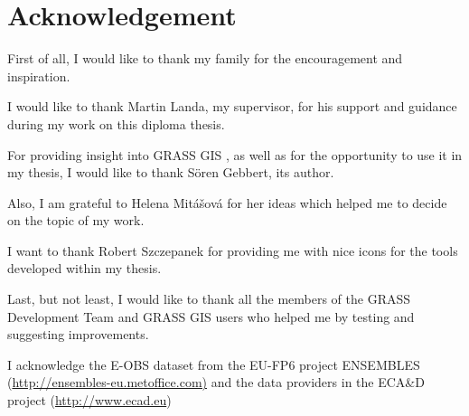 \chapter*{Acknowledgement}
\thispagestyle{empty}

First of all, I would like to thank my family for the encouragement and inspiration.

I would like to thank Martin Landa, my supervisor, for his support
and guidance during my work on this diploma thesis.

For providing insight into GRASS GIS \tf, as well as
for the opportunity to use it in my thesis, I would like to thank S\"{o}ren Gebbert, its author.

Also, I am grateful to Helena Mitášová for her ideas
which helped me to decide on the topic of my work.

I want to thank Robert Szczepanek for providing me with nice icons for the tools developed within my thesis.

Last, but not least, I would like to thank all the members of the GRASS Development Team and GRASS GIS users
who helped me by testing and suggesting improvements.


I acknowledge the E-OBS dataset from the EU-FP6 project ENSEMBLES\newline
(\url{http://ensembles-eu.metoffice.com)} and the data providers
in the ECA\&D project (\url{http://www.ecad.eu})


